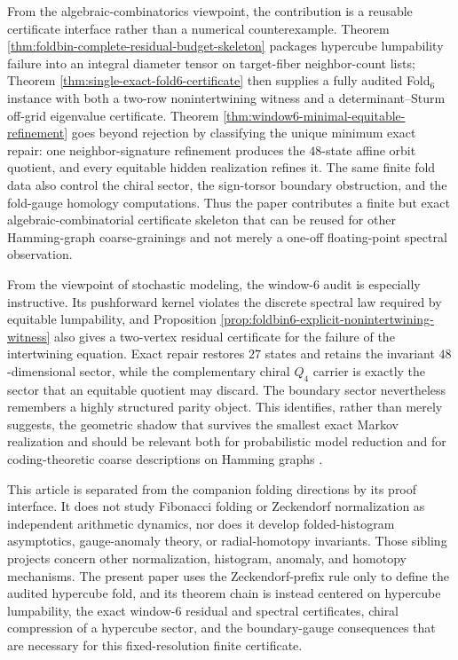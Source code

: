 \documentclass[12pt,a4paper]{article}
\theoremstyle{plain}
\theoremstyle{definition}
\numberwithin{equation}{section}
\begin{document}
From the algebraic-combinatorics viewpoint, the contribution is a reusable certificate interface rather than a numerical counterexample.  Theorem \ref{thm:foldbin-complete-residual-budget-skeleton} packages hypercube lumpability failure into an integral diameter tensor on target-fiber neighbor-count lists; Theorem \ref{thm:single-exact-fold6-certificate} then supplies a fully audited Fold\(_6\) instance with both a two-row nonintertwining witness and a determinant--Sturm off-grid eigenvalue certificate.  Theorem \ref{thm:window6-minimal-equitable-refinement} goes beyond rejection by classifying the unique minimum exact repair: one neighbor-signature refinement produces the \(48\)-state affine orbit quotient, and every equitable hidden realization refines it.  The same finite fold data also control the chiral sector, the sign-torsor boundary obstruction, and the fold-gauge homology computations.  Thus the paper contributes a finite but exact algebraic-combinatorial certificate skeleton that can be reused for other Hamming-graph coarse-grainings and not merely a one-off floating-point spectral observation.

From the viewpoint of stochastic modeling, the window-\(6\) audit is especially instructive. Its pushforward kernel violates the discrete spectral law required by equitable lumpability, and Proposition \ref{prop:foldbin6-explicit-nonintertwining-witness} also gives a two-vertex residual certificate for the failure of the intertwining equation.  Exact repair restores \(27\) states and retains the invariant \(48\)-dimensional sector, while the complementary chiral \(Q_4\) carrier is exactly the sector that an equitable quotient may discard.  The boundary sector nevertheless remembers a highly structured parity object.  This identifies, rather than merely suggests, the geometric shadow that survives the smallest exact Markov realization and should be relevant both for probabilistic model reduction and for coding-theoretic coarse descriptions on Hamming graphs \cite{macwilliams1977theory,godsil2001algebraic}.

This article is separated from the companion folding directions by its proof interface.  It does not study Fibonacci folding or Zeckendorf normalization as independent arithmetic dynamics, nor does it develop folded-histogram asymptotics, gauge-anomaly theory, or radial-homotopy invariants.  Those sibling projects concern other normalization, histogram, anomaly, and homotopy mechanisms.  The present paper uses the Zeckendorf-prefix rule only to define the audited hypercube fold, and its theorem chain is instead centered on hypercube lumpability, the exact window-\(6\) residual and spectral certificates, chiral compression of a hypercube sector, and the boundary-gauge consequences that are necessary for this fixed-resolution finite certificate.
\end{document}
